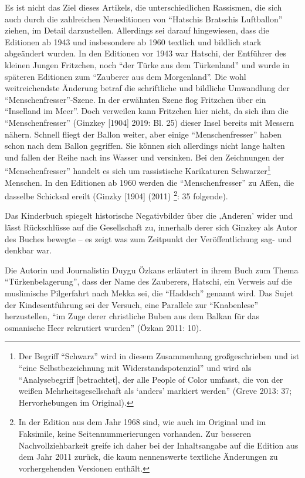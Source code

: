 \documentclass[a4paper,
fontsize=11pt,
oneside,
numbers=noperiodatend,
parskip=half-,
bibliography=totoc,
final
]{scrartcl}
\begin{document}
Es ist nicht das Ziel dieses Artikels, die unterschiedlichen Rassismen,
die sich auch durch die zahlreichen Neueditionen von \enquote{Hatschis
Bratschis Luftballon} ziehen, im Detail darzustellen. Allerdings sei
darauf hingewiesen, dass die Editionen ab 1943 und insbesondere ab 1960
textlich und bildlich stark abgeändert wurden. In den Editionen vor 1943
war Hatschi, der Entführer des kleinen Jungen Fritzchen, noch \enquote{der
Türke aus dem Türkenland} und wurde in späteren Editionen zum
\enquote{Zauberer aus dem Morgenland}. Die wohl weitreichendste Änderung
betraf die schriftliche und bildliche Umwandlung der
\enquote{Menschenfresser}-Szene. In der erwähnten Szene flog Fritzchen über
ein \enquote{Inselland im Meer}. Doch verweilen kann Fritzchen hier nicht, da
sich ihm die \enquote{Menschenfresser} (Ginzkey [1904] 2019: Bl. 25)
dieser Insel bereits mit Messern nähern. Schnell fliegt der Ballon
weiter, aber einige \enquote{Menschenfresser} haben schon nach dem Ballon
gegriffen. Sie können sich allerdings nicht lange halten und fallen der
Reihe nach ins Wasser und versinken. Bei den Zeichnungen der
\enquote{Menschenfresser} handelt es sich um rassistische Karikaturen
Schwarzer\footnote{Der Begriff \enquote{Schwarz} wird in diesem Zusammenhang
  großgeschrieben und ist \enquote{eine Selbstbezeichnung mit
  Widerstandspotenzial} und wird als \enquote{Analysebegriff [betrachtet],
  der alle People of Color umfasst, die von der weißen
  Mehrheitsgesellschaft als `anders' markiert werden} (Greve 2013: 37;
  Hervorhebungen im Original).} Menschen. In den Editionen ab 1960
werden die \enquote{Menschenfresser} zu Affen, die dasselbe Schicksal ereilt
(Ginzky [1904] (2011) \footnote{In der Edition aus dem Jahr 1968
  sind, wie auch im Original und im Faksimile, keine
  Seitennummerierungen vorhanden. Zur besseren Nachvollziehbarkeit
  greife ich daher bei der Inhaltsangabe auf die Edition aus dem Jahr
  2011 zurück, die kaum nennenswerte textliche Änderungen zu
  vorhergehenden Versionen enthält.}: 35 folgende).

Das Kinderbuch spiegelt historische Negativbilder über die ‚Anderen'
wider und lässt Rückschlüsse auf die Gesellschaft zu, innerhalb derer
sich Ginzkey als Autor des Buches bewegte -- es zeigt was zum Zeitpunkt
der Veröffentlichung sag- und denkbar war.

Die Autorin und Journalistin Duygu Özkans erläutert in ihrem Buch zum
Thema \enquote{Türkenbelagerung}, dass der Name des Zauberers, Hatschi, ein
Verweis auf die muslimische Pilgerfahrt nach Mekka sei, die \enquote{Haddsch}
genannt wird. Das Sujet der Kindesentführung sei der Versuch, eine
Parallele zur \enquote{Knabenlese} herzustellen, \enquote{im Zuge derer christliche
Buben aus dem Balkan für das osmanische Heer rekrutiert wurden} (Özkan
2011: 10).
\end{document}
